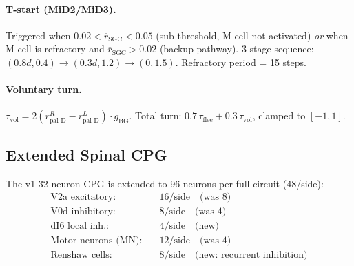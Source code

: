 \documentclass[11pt,a4paper]{article}
\begin{document}
\paragraph{T-start (MiD2/MiD3).}
Triggered when $0.02 < \overline{r}_\text{SGC} < 0.05$ (sub-threshold, M-cell
not activated) \emph{or} when M-cell is refractory and
$\overline{r}_\text{SGC} > 0.02$ (backup pathway).
3-stage sequence: $(0.8d, 0.4) \to (0.3d, 1.2) \to (0, 1.5)$.
Refractory period = 15 steps.

\paragraph{Voluntary turn.}
$\tau_\text{vol} = 2(r_\text{pal-D}^R - r_\text{pal-D}^L)\cdot g_\text{BG}$.
Total turn: $0.7\,\tau_\text{flee} + 0.3\,\tau_\text{vol}$, clamped to $[-1, 1]$.

\subsection{Extended Spinal CPG}

The v1 32-neuron CPG is extended to 96 neurons per full circuit (48/side):
\begin{equation}
\begin{aligned}
  \text{V2a excitatory}: &\quad 16/\text{side} \quad\text{(was 8)} \\
  \text{V0d inhibitory}: &\quad  8/\text{side} \quad\text{(was 4)} \\
  \text{dI6 local inh.}: &\quad  4/\text{side} \quad\text{(new)} \\
  \text{Motor neurons (MN)}: &\quad 12/\text{side} \quad\text{(was 4)} \\
  \text{Renshaw cells}:  &\quad  8/\text{side} \quad\text{(new: recurrent inhibition)}
\end{aligned}
\end{equation}
\end{document}
